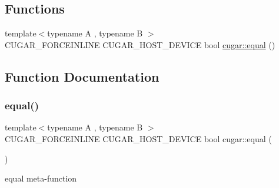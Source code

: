 \subsection*{Functions}
\begin{DoxyCompactItemize}
\item 
{\footnotesize template$<$typename A , typename B $>$ }\\C\+U\+G\+A\+R\+\_\+\+F\+O\+R\+C\+E\+I\+N\+L\+I\+NE C\+U\+G\+A\+R\+\_\+\+H\+O\+S\+T\+\_\+\+D\+E\+V\+I\+CE bool \hyperlink{group___basic_meta_functions_ga939b5b82e4150264a08ce1d37404f914}{cugar\+::equal} ()
\end{DoxyCompactItemize}


\subsection{Function Documentation}
\mbox{\label{group___basic_meta_functions_ga939b5b82e4150264a08ce1d37404f914}} 
\subsubsection{\texorpdfstring{equal()}{equal()}}
{\footnotesize\ttfamily template$<$typename A , typename B $>$ \\
C\+U\+G\+A\+R\+\_\+\+F\+O\+R\+C\+E\+I\+N\+L\+I\+NE C\+U\+G\+A\+R\+\_\+\+H\+O\+S\+T\+\_\+\+D\+E\+V\+I\+CE bool cugar\+::equal (\begin{DoxyParamCaption}{ }\end{DoxyParamCaption})}

equal meta-\/function 